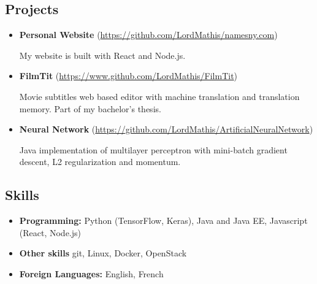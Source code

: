 \documentclass[a4,12pt]{article}
\providecommand{\tightlist}{%
  \setlength{\itemsep}{0pt}\setlength{\parskip}{0pt}}
\begin{document}
\subsection*{Projects}\label{projects}

\begin{itemize}

\item
  \textbf{Personal Website} (\href{https://github.com/LordMathis/namesny.com}{https://github.com/LordMathis/namesny.com})
  
  My website is built with React and Node.js.

\item
  \textbf{FilmTit} (\href{https://www.github.com/LordMathis/FilmTit}{https://www.github.com/LordMathis/FilmTit})

  Movie subtitles web based editor with machine translation and
  translation memory. Part of my bachelor's thesis.
  
\item
    \textbf{Neural Network} (\href{https://github.com/LordMathis/ArtificialNeuralNetwork}{https://github.com/LordMathis/ArtificialNeuralNetwork})

    Java implementation of multilayer perceptron with mini-batch gradient descent, L2 regularization and momentum.

\end{itemize}

\subsection*{Skills}\label{skills}

\begin{itemize}
\tightlist
\item
  \textbf{Programming:} Python (TensorFlow, Keras), Java and Java EE, Javascript (React, Node.js)
\item
  \textbf{Other skills} git, Linux, Docker, OpenStack
\item
  \textbf{Foreign Languages:} English, French
\end{itemize}
\end{document}

